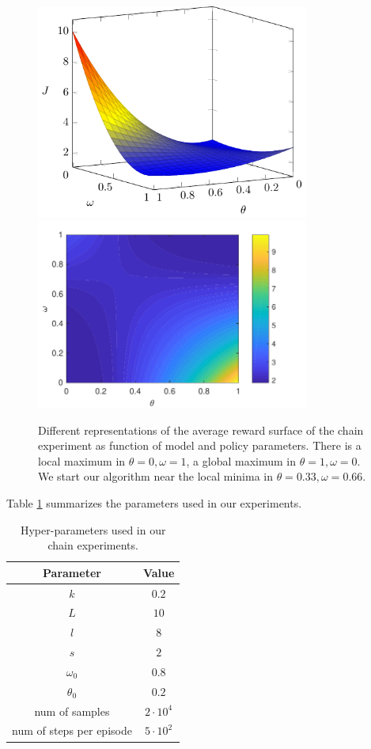 \begin{figure}[!tb]
\centering
\includegraphics[width=0.8\textwidth]{plots/chain/plot_chain_surface}
\includegraphics[width=0.8\textwidth]{plots/chain/plot_chain_colormap}
	\caption{Different representations of the average reward surface of the chain experiment as function of model and policy parameters. There is a local maximum in $\theta=0, \omega=1$, a global maximum in $\theta=1, \omega=0$. We start our algorithm near the local minima in $\theta=0.33, \omega=0.66$.}
	\label{fig:chain-rew}
\end{figure}
Table \ref{tab:chain-hyperparameters} summarizes the parameters used in our experiments. \newline
\begin{table}[t]
\centering
\begin{tabular}{ c c}
  \toprule			
  Parameter & Value \\
  \midrule
  $k$ & $0.2$ \\
  $L$ & $10$ \\
  $l$ & $8$ \\
  $s$ & $2$ \\
  $\omega_0$ & $0.8$ \\
  $\theta_0$ & $0.2$ \\
  num of samples & $2 \cdot 10^4$ \\
  num of steps per episode & $5 \cdot 10^2$ \\
\bottomrule
\end{tabular}
\caption{Hyper-parameters used in our chain experiments.} \label{tab:chain-hyperparameters}
\end{table}
